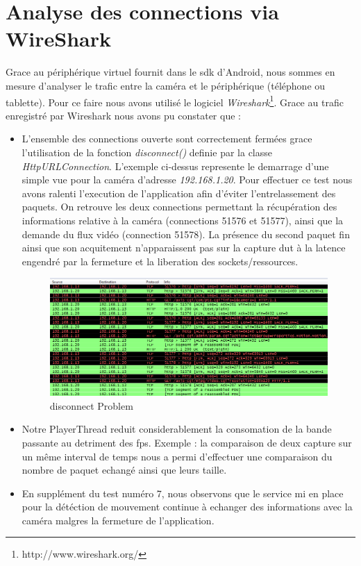 \section{Analyse des connections via WireShark}
Grace au périphérique virtuel fournit dans le sdk d'Android, nous sommes en
mesure d'analyser le trafic entre la caméra et le périphérique (téléphone ou
tablette). Pour ce faire nous avons utilisé le logiciel
\textit{Wireshark}\footnote{\label{Wireshark}http://www.wireshark.org/}.\newline
Grace au trafic enregistré par Wireshark nous avons pu constater que :
\begin{itemize}
  \item L'ensemble des connections ouverte sont correctement fermées grace
  l'utilisation de la fonction \textit{disconnect()} definie par la classe \textit{HttpURLConnection}.
  L'exemple ci-dessus represente le demarrage d'une simple vue pour la caméra d'adresse
  \textit{192.168.1.20}. Pour effectuer ce test nous avons ralenti l'execution
  de l'application afin d'éviter l'entrelassement des paquets. On retrouve les
  deux connections permettant la récupération des informations relative à la
  caméra (connections 51576 et 51577), ainsi que la demande du flux vidéo
  (connection 51578). La présence du second paquet 
  fin ainsi que son acquitement n'apparaissent pas sur la capture dut à la
  latence engendré par la fermeture et la liberation des sockets/ressources.
\begin{center}
 \begin{figure}[H] 
  \label{finConnection}
  \centering
  \includegraphics[scale=0.7]{Images/finConnection.png}
  \caption{disconnect Problem}
\end{figure}  
\end{center}

  \item Notre PlayerThread reduit considerablement la consomation de la bande
  passante au detriment des fps. Exemple : la comparaison de deux capture sur un
  même interval de temps nous a permi d'effectuer une comparaison du nombre de
  paquet echangé ainsi que leurs taille.
  \item En supplément du test numéro 7,  nous observons que le service mi en
  place pour la détéction de mouvement continue à echanger des informations avec
  la caméra malgres la fermeture de l'application. 
\end{itemize}
